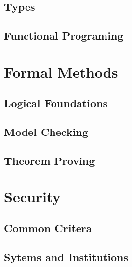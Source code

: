 \documentclass{book}
\begin{document}

   
  \chapter{Types}

  \chapter{Functional Programing}

\part{Formal Methods}

  \chapter{Logical Foundations}

  \chapter{Model Checking} %
    

  \chapter{Theorem Proving} %
   

\part{Security}

  \chapter{Common Critera}

  \chapter{Sytems and Institutions}
\end{document}
